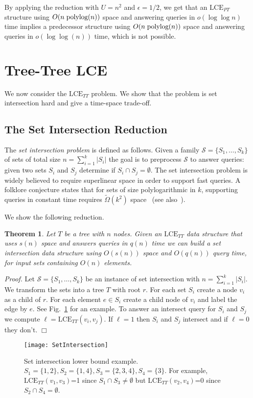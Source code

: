 \documentclass [10pt]{article}
\newtheorem{theorem}{Theorem}
\newcommand{\qed}{\hfill\ensuremath{\Box}\medskip\\\noindent}
\newenvironment{proof}{\noindent\emph{Proof. }}{}
\newcommand{\LCEPT}{\ensuremath{\mathrm{LCE}_{\mathit{PT}}}}
\newcommand{\LCETT}{\ensuremath{\mathrm{LCE}_{\mathit{TT}}}}
\newcommand{\polylog}{\text{\hspace{1mm}polylog}}
\begin{document}
By applying the reduction with $U=n^{2}$ and $\epsilon=1/2$, we get that an $\LCEPT$ structure using $O(n\polylog(n))$ space and answering queries
in $o(\log\log n)$ time implies a predecessor structure using $O(n\polylog(n))$ space and answering queries in $o(\log\log(n))$ time,
which is not possible.

\section{Tree-Tree LCE} 
We now consider the $\LCETT$ problem. We show that the problem is set intersection hard and give a time-space trade-off. 

\subsection{The Set Intersection Reduction}
The \emph{set intersection problem} is defined as follows. Given a family $\mathcal{S} = \{S_1, \ldots, S_k\}$ of sets of total size $n  = \sum_{i=1}^k |S_i|$ the goal is to preprocess $\mathcal{S}$ to answer queries: given two sets $S_i$ and $S_j$ determine if $S_i \cap S_j = \emptyset$. The set intersection problem is widely believed to require superlinear space in order to support fast queries. A folklore conjecture states that for sets of size polylogarithmic in $k$, supporting queries in constant time requires $\tilde \Omega(k^2)$ space~\cite{PR2014} (see also~\cite{CP2010}).


We show the following reduction. 
\begin{theorem}
Let $T$ be a tree with $n$ nodes. Given an $\LCETT$ data structure that uses $s(n)$ space and answers queries in $q(n)$ time we can build a set intersection data structure using $O(s(n))$ space and $O(q(n))$ query time, for input sets containing $O(n)$ elements.
\end{theorem}
\begin{proof}
Let $\mathcal{S} = \{S_1, \ldots, S_k\}$ be an instance of set intersection with $n = \sum_{i=1}^k |S_i|$. We transform the sets into a tree $T$ with root $r$. For each set $S_i$ create a node $v_i$ as a child of $r$. For each element $e \in S_i$ create a child node of $v_i$ and label the edge by $e$. See Fig.~\ref{fig:setintersection} for an example. To answer an intersect query for $S_i$ and $S_j$ we compute $\ell = \LCETT(v_i, v_j)$. If $\ell = 1$ then $S_i$ and $S_j$ intersect and if $\ell = 0$ they don't. \qed
\end{proof}
\begin{figure}
\begin{center}
\texttt{[image: SetIntersection]}
\end{center}
\caption{Set intersection lower bound example.  $S_1=\{1,2\}, S_2=\{1,4\}, S_3=\{2,3,4\}, S_4=\{3\}$. For example, $\LCETT(v_1, v_3)$=1 since  $S_1 \cap S_3 \neq \emptyset$ but $\LCETT(v_2, v_4)$=0 since  $S_2 \cap S_4 = \emptyset$. }
\label{fig:setintersection}
\end{figure}
\end{document}
